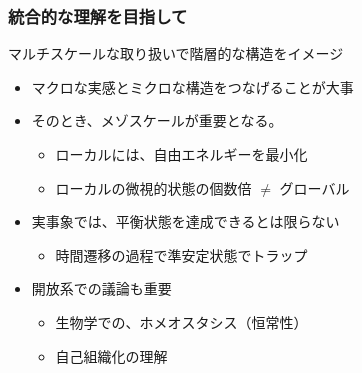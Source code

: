 \documentclass[unicode,12pt]{beamer}%
\begin{document}
\begin{frame}
    \frametitle{統合的な理解を目指して}
    \begin{block}{マルチスケールな取り扱いで階層的な構造をイメージ}
        \begin{itemize}
            \item マクロな実感とミクロな構造をつなげることが大事
            \item そのとき、メゾスケールが重要となる。
            \begin{itemize}
                \item ローカルには、自由エネルギーを最小化
                \item ローカルの微視的状態の個数倍 $\neq$ グローバル
            \end{itemize}
            \item 実事象では、平衡状態を達成できるとは限らない
            \begin{itemize}
                \item 時間遷移の過程で準安定状態でトラップ
            \end{itemize}
            \item 開放系での議論も重要
            \begin{itemize}
                \item 生物学での、ホメオスタシス（恒常性）
                \item 自己組織化の理解
            \end{itemize}
        \end{itemize}
    \end{block}
\end{frame}
\end{document}
